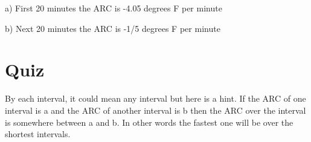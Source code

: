 \documentclass{tufte-handout}
\begin{document}
a) First 20 minutes the ARC is -4.05 degrees F per minute 

b) Next 20 minutes the ARC is -1/5 degrees F per minute
\section{Quiz}
By each interval, it could mean any interval but here is a hint.  If the ARC of one interval is a and the ARC of another interval is b then the ARC over the interval is somewhere between a and b.  In other words the fastest one will be over the shortest intervals.
\end{document}
